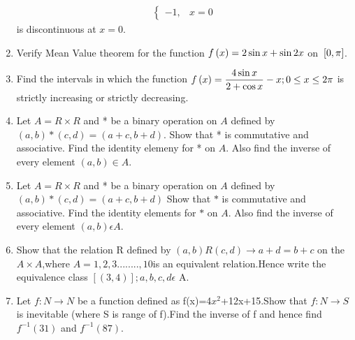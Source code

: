 \begin{enumerate}
\begin{align*}
\begin{cases}
			                    -1 ,                                              & x = 0
		                    \end{cases}
	      \end{align*}
	      is discontinuous at $x=0$.
	\item Verify Mean Value theorem for the function $f\left(x\right) = 2\sin{x} + \sin{2x}$ on ${}\left[0,\pi\right]$.
	\item Find the intervals in which the function $f\left(x\right) = \dfrac{4\sin x}{2 + \cos x} - x; 0 \leq x \leq 2\pi$ is strictly increasing or strictly decreasing.
	\item Let $A=R\times R$ and * be a binary operation on $A$ defined by $(a,b)*(c,d) = (a+c,b+d)$.
	      Show that * is commutative and associative. Find the identity elemeny for * on $A$. Also find the inverse of every element $(a, b) \in A$.
	\item Let $A=R\times R$ and * be a binary operation on $A$ defined by\\ $ (a,b)*(c,d)=(a+c, b+d)$
	      Show that $*$ is commutative and associative. Find the identity elements for $*$ on $A$. Also find the inverse of every element $(a,b)\epsilon A$.
	\item Show that the relation R defined by $(a,b) R(c,d) \rightarrow a+d=b+c$ on the  $A\times A$,where $A={1,2,3........,10} $is an equivalent relation.Hence write the equivalence class $[(3,4)]; a,b,c,d \epsilon$ A.
	\item Let $f:N\rightarrow{N}$ be a function defined as f(x)=4$x^{2}$+12x+15.Show that $f:N\rightarrow{S}$ is inevitable (where S is range of f).Find the inverse of f and hence find $f^{-1}(31)$ and $f^{-1}(87)$.

\end{enumerate}
